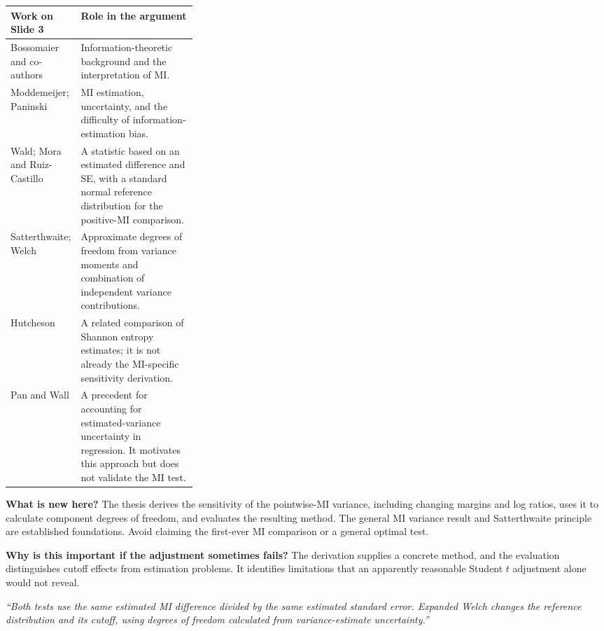 \begin{tabularx}{\linewidth}{@{}p{0.31\linewidth}X@{}}
\toprule
\textbf{Work on Slide 3} & \textbf{Role in the argument}\\
\midrule
Bossomaier and co-authors & Information-theoretic background and the interpretation of MI.\\
Moddemeijer; Paninski & MI estimation, uncertainty, and the difficulty of information-estimation bias.\\
Wald; Mora and Ruiz-Castillo & A statistic based on an estimated difference and SE, with a standard normal reference distribution for the positive-MI comparison.\\
Satterthwaite; Welch & Approximate degrees of freedom from variance moments and combination of independent variance contributions.\\
Hutcheson & A related comparison of Shannon entropy estimates; it is not already the MI-specific sensitivity derivation.\\
Pan and Wall & A precedent for accounting for estimated-variance uncertainty in regression. It motivates this approach but does not validate the MI test.\\
\bottomrule
\end{tabularx}

\textbf{What is new here?} The thesis derives the sensitivity of the pointwise-MI variance, including changing margins and log ratios, uses it to calculate component degrees of freedom, and evaluates the resulting method. The general MI variance result and Satterthwaite principle are established foundations. Avoid claiming the first-ever MI comparison or a general optimal test.

\textbf{Why is this important if the adjustment sometimes fails?} The derivation supplies a concrete method, and the evaluation distinguishes cutoff effects from estimation problems. It identifies limitations that an apparently reasonable Student \(t\) adjustment alone would not reveal.

\newpage
{}

\emph{``Both tests use the same estimated MI difference divided by the same estimated standard error. Expanded Welch changes the reference distribution and its cutoff, using degrees of freedom calculated from variance-estimate uncertainty.''}

